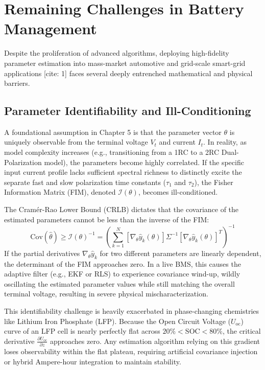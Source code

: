 \section{Remaining Challenges in Battery Management}
\label{sec:remaining_challenges}

Despite the proliferation of advanced algorithms, deploying high-fidelity parameter estimation into mass-market automotive and grid-scale smart-grid applications \cite{rahimi2013battery}[cite: 1] faces several deeply entrenched mathematical and physical barriers. 

\subsection{Parameter Identifiability and Ill-Conditioning}
\label{subsec:identifiability_challenges}

A foundational assumption in Chapter 5 is that the parameter vector $\theta$ is uniquely observable from the terminal voltage $V_t$ and current $I_t$. In reality, as model complexity increases (e.g., transitioning from a 1RC to a 2RC Dual-Polarization model), the parameters become highly correlated. If the specific input current profile lacks sufficient spectral richness to distinctly excite the separate fast and slow polarization time constants ($\tau_1$ and $\tau_2$), the Fisher Information Matrix (FIM), denoted $\mathcal{I}(\theta)$, becomes ill-conditioned.

The Cramér-Rao Lower Bound (CRLB) dictates that the covariance of the estimated parameters cannot be less than the inverse of the FIM:
\begin{equation}
\label{eq:crlb_conclusion}
\mathrm{Cov}(\hat{\theta}) \ge \mathcal{I}(\theta)^{-1} = \left( \sum_{k=1}^{N} \left[ \nabla_{\theta} \hat{y}_k(\theta) \right] \Sigma^{-1} \left[ \nabla_{\theta} \hat{y}_k(\theta) \right]^T \right)^{-1}
\end{equation}
If the partial derivatives $\nabla_{\theta} \hat{y}_k$ for two different parameters are linearly dependent, the determinant of the FIM approaches zero. In a live BMS, this causes the adaptive filter (e.g., EKF or RLS) to experience covariance wind-up, wildly oscillating the estimated parameter values while still matching the overall terminal voltage, resulting in severe physical mischaracterization.

This identifiability challenge is heavily exacerbated in phase-changing chemistries like Lithium Iron Phosphate (LFP). Because the Open Circuit Voltage ($U_{\mathrm{oc}}$) curve of an LFP cell is nearly perfectly flat across $20\% < \mathrm{SOC} < 80\%$, the critical derivative $\frac{\partial U_{\mathrm{oc}}}{\partial z}$ approaches zero. Any estimation algorithm relying on this gradient loses observability within the flat plateau, requiring artificial covariance injection or hybrid Ampere-hour integration to maintain stability.

